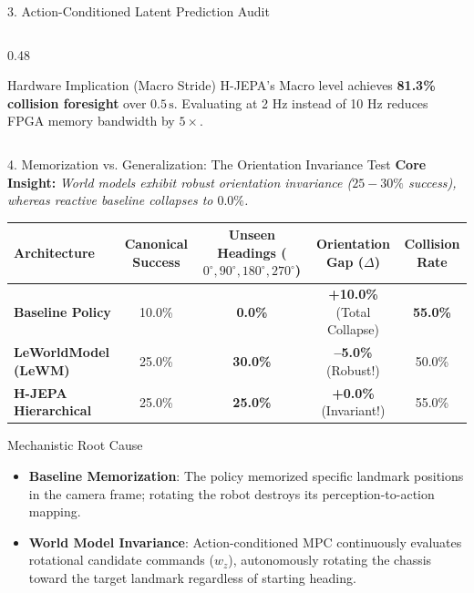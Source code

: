 \documentclass[aspectratio=169, 10pt]{beamer}
\begin{document}
\begin{frame}{3. Action-Conditioned Latent Prediction Audit}
\begin{columns}[T]
    \begin{column}{0.48\textwidth}
      \begin{alertblock}{Hardware Implication (Macro Stride)}
        \small
        H-JEPA's Macro level achieves \textbf{81.3\% collision foresight} over $0.5\,\text{s}$. Evaluating at 2 Hz instead of 10 Hz reduces FPGA memory bandwidth by \textbf{$5\times$}.
      \end{alertblock}
    \end{column}
  \end{columns}
\end{frame}

\begin{frame}{4. Memorization vs. Generalization: The Orientation Invariance Test}
  \textbf{Core Insight:} \textit{World models exhibit robust orientation invariance ($25-30\%$ success), whereas reactive baseline collapses to $0.0\%$.}

  \vspace{0.2cm}
  \begin{table}[h]
    \centering
    \small
    \begin{tabular}{lcccc}
      \toprule
      \textbf{Architecture} & \textbf{Canonical Success} & \textbf{Unseen Headings ($0^\circ, 90^\circ, 180^\circ, 270^\circ$)} & \textbf{Orientation Gap ($\Delta$)} & \textbf{Collision Rate} \\
      \midrule
      \textbf{Baseline Policy} & 10.0\% & \textbf{0.0\%} & \textbf{+10.0\%} (Total Collapse) & \textbf{55.0\%} \\
      \textbf{LeWorldModel (LeWM)} & 25.0\% & \textbf{30.0\%} & \textbf{--5.0\%} (Robust!) & 50.0\% \\
      \textbf{H-JEPA Hierarchical} & 25.0\% & \textbf{25.0\%} & \textbf{+0.0\%} (Invariant!) & 55.0\% \\
      \bottomrule
    \end{tabular}
  \end{table}

  \vspace{0.3cm}
  \begin{block}{Mechanistic Root Cause}
    \small
    \begin{itemize}
      \item \textbf{Baseline Memorization}: The policy memorized specific landmark positions in the camera frame; rotating the robot destroys its perception-to-action mapping.
      \item \textbf{World Model Invariance}: Action-conditioned MPC continuously evaluates rotational candidate commands ($w_z$), autonomously rotating the chassis toward the target landmark regardless of starting heading.
    \end{itemize}
  \end{block}
\end{frame}
\end{document}
